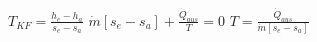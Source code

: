 \( T_{KF} = \frac{h_e - h_a}{s_e - s_a} \)  
\( \dot{m} [s_e - s_a] + \frac{\dot{Q}_{aus}}{T} = 0 \)  
\( T = \frac{\dot{Q}_{aus}}{\dot{m} [s_e - s_a]} \)